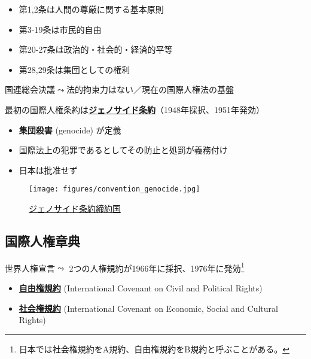 \documentclass[
  xelatex,
  ja=standard]{bxjsarticle}
\providecommand{\tightlist}{%
  \setlength{\itemsep}{0pt}\setlength{\parskip}{0pt}}\usepackage{longtable,booktabs,array}
\begin{document}
\begin{itemize}
\tightlist
\item
  第1,2条は人間の尊厳に関する基本原則
\item
  第3-19条は市民的自由
\item
  第20-27条は政治的・社会的・経済的平等
\item
  第28,29条は集団としての権利
\end{itemize}

国連総会決議\(\leadsto\)法的拘束力はない／現在の国際人権法の基盤

最初の国際人権条約は\href{https://worldjpn.grips.ac.jp/documents/texts/mt/19481209.T1J.html}{\textbf{ジェノサイド条約}}（1948年採択、1951年発効）

\begin{itemize}
\tightlist
\item
  \textbf{集団殺害} (genocide) が定義
\item
  国際法上の犯罪であるとしてその防止と処罰が義務付け
\item
  日本は批准せず
\end{itemize}

\begin{figure}[htpb]

{\centering \texttt{[image: figures/convention\_genocide.jpg]}

}

\caption{\href{https://www.un.org/en/genocideprevention/genocide-convention.shtml}{ジェノサイド条約締約国}}

\end{figure}

\hypertarget{ux56fdux969bux4ebaux6a29ux7ae0ux5178}{%
\subsection{国際人権章典}\label{ux56fdux969bux4ebaux6a29ux7ae0ux5178}}

世界人権宣言\(\leadsto\)
2つの人権規約が1966年に採択、1976年に発効\footnote{日本では社会権規約をA規約、自由権規約をB規約と呼ぶことがある。}

\begin{itemize}
\tightlist
\item
  \href{https://www.nichibenren.or.jp/activity/international/library/human_rights/liberty_convention.html}{\textbf{自由権規約}}
  (International Covenant on Civil and Political Rights)
\item
  \href{https://www.nichibenren.or.jp/activity/international/library/human_rights/society_convention.html}{\textbf{社会権規約}}
  (International Covenant on Economic, Social and Cultural Rights)
\end{itemize}
\end{document}

